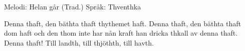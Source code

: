 \begin{song}

\begin{songmeta}
Melodi: Helan går (Trad.)
Språk: Thventhka
\end{songmeta}

\begin{songtext}
Denna thaft,
den bäthta thaft thythemet haft.
Denna thaft,
den bäthta thaft dom haft
och den thom inte har nån kraft
han dricka thkall av denna thaft.
Denna thaft!
Till landth, till thjöthth, till havth.
\end{songtext}

\end{song}
